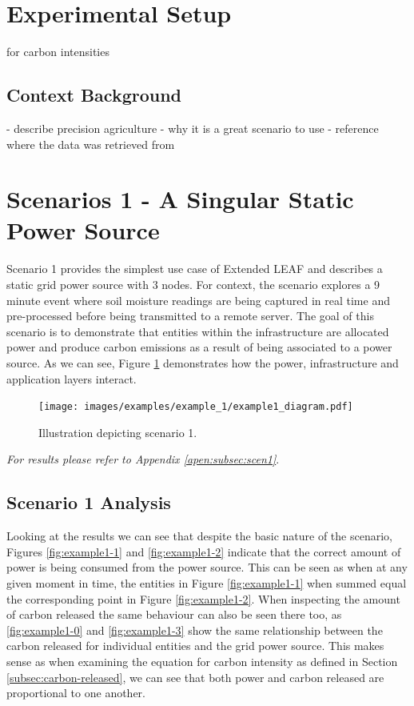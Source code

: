 \documentclass{l4proj}
\begin{document}
\section{Experimental Setup}\label{eval:sec:scenarios}

for carbon intensities

\subsection{Context Background}\label{eval:subsec:precision-agriculture}
- describe precision agriculture
- why it is a great scenario to use
- reference where the data was retrieved from

\section{Scenarios 1 - A Singular Static Power Source}\label{eval:subsec:scenario1}
Scenario 1 provides the simplest use case of Extended LEAF and describes a static grid power source with 3 nodes.
For context, the scenario explores a 9 minute event where soil moisture readings are being captured in real time and pre-processed before being transmitted to a remote server.
The goal of this scenario is to demonstrate that entities within the infrastructure are allocated power and  produce carbon emissions as a result of being associated to a power source.
As we can see, Figure \ref{fig:example1_diagram} demonstrates how the power, infrastructure and application layers interact.

\begin{figure}[h]
    \centering
    \texttt{[image: images/examples/example\_1/example1\_diagram.pdf]}
    ~
    \caption{Illustration depicting scenario 1.}
    \label{fig:example1_diagram}
\end{figure}

\textit{For results please refer to Appendix \ref{apen:subsec:scen1}}.\\

\subsection{Scenario 1 Analysis}
Looking at the results we can see that despite the basic nature of the scenario, Figures \ref{fig:example1-1} and \ref{fig:example1-2} indicate that the correct amount of power is being consumed from the power source.
This can be seen as when at any given moment in time, the entities in Figure \ref{fig:example1-1} when summed equal the corresponding point in Figure \ref{fig:example1-2}.
When inspecting the amount of carbon released the same behaviour can also be seen there too, as \ref{fig:example1-0} and \ref{fig:example1-3} show the same relationship between the carbon released for individual entities and the grid power source.
This makes sense as when examining the equation for carbon intensity as defined in Section \ref{subsec:carbon-released}, we can see that both power and carbon released are proportional to one another.
\end{document}
